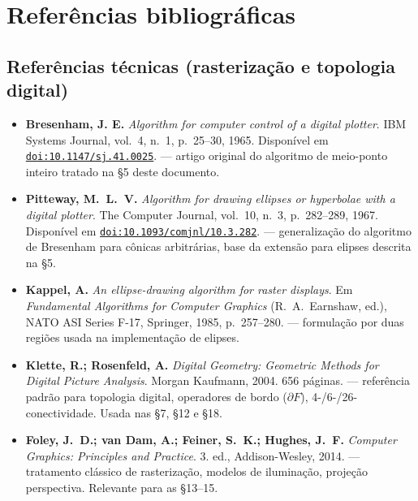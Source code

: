 \documentclass[12pt,a4paper]{scrartcl}
\newcommand{\biblink}[2]{\href{#1}{\nolinkurl{#2}}}
\begin{document}
\section*{\color{accent}Referências bibliográficas}
\label{sec:bib}

\subsection*{Referências técnicas (rasterização e topologia digital)}

\begin{itemize}[leftmargin=1.4em,itemsep=0.3em,topsep=0.3em]
  \item \textbf{Bresenham, J. E.} \emph{Algorithm for computer control of a digital plotter}.
        IBM Systems Journal, vol.~4, n.~1, p.~25--30, 1965.
        Disponível em \biblink{https://doi.org/10.1147/sj.41.0025}{doi:10.1147/sj.41.0025}.
        --- artigo original do algoritmo de meio-ponto inteiro tratado na §5 deste documento.

  \item \textbf{Pitteway, M.~L.~V.} \emph{Algorithm for drawing ellipses or hyperbolae
        with a digital plotter}. The Computer Journal, vol.~10, n.~3, p.~282--289, 1967.
        Disponível em \biblink{https://doi.org/10.1093/comjnl/10.3.282}{doi:10.1093/comjnl/10.3.282}.
        --- generalização do algoritmo de Bresenham para cônicas arbitrárias, base da extensão para elipses descrita na §5.

  \item \textbf{Kappel, A.} \emph{An ellipse-drawing algorithm for raster displays}.
        Em \emph{Fundamental Algorithms for Computer Graphics} (R.~A.~Earnshaw, ed.),
        NATO ASI Series F-17, Springer, 1985, p.~257--280.
        --- formulação por duas regiões usada na implementação de elipses.

  \item \textbf{Klette, R.; Rosenfeld, A.} \emph{Digital Geometry: Geometric Methods
        for Digital Picture Analysis}. Morgan Kaufmann, 2004. 656 páginas.
        --- referência padrão para topologia digital, operadores de bordo ($\partial F$), 4-/6-/26-conectividade. Usada nas §7, §12 e §18.

  \item \textbf{Foley, J.~D.; van Dam, A.; Feiner, S.~K.; Hughes, J.~F.}
        \emph{Computer Graphics: Principles and Practice}. 3.\textordmasculine{} ed., Addison-Wesley, 2014.
        --- tratamento clássico de rasterização, modelos de iluminação, projeção perspectiva. Relevante para as §13--15.
\end{itemize}
\end{document}
